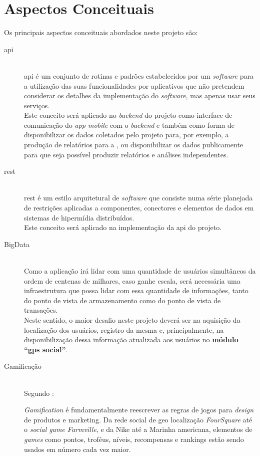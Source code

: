 \chapter{Aspectos Conceituais}\label{chp:aspectosConceituais}
Os principais aspectos conceituais abordados neste projeto são:
\begin{description}
    \item[\gls{api}] \cite{apifoldoc} \hfill \\
        \gls{api} é um conjunto de rotinas e padrões estabelecidos por um \textit{software} para a utilização das suas funcionalidades por aplicativos que não pretendem considerar os detalhes da implementação do \textit{software}, mas apenas usar seus serviços.\\
        Este conceito será aplicado no \textit{backend} do projeto como interface de comunicação do \textit{app mobile} com o \textit{backend} e também como forma de disponibilizar os dados coletados pelo projeto para, por exemplo, a produção de relatórios para a \sptrans, ou disponibilizar os dados publicamente para que seja possível produzir relatórios e análises independentes.%
%
	\item[\gls{rest}] \cite{Fielding2000} \hfill \\
	    \gls{rest} é um estilo arquitetural de \textit{software} que consiste numa série planejada de restrições aplicadas a componentes, conectores e elementos de dados em sistemas de hipermídia distribuídos. \\
	    Este conceito será aplicado na implementação da \gls{api} do projeto.%
%
	\item[BigData] \hfill \\
	    Como a aplicação irá lidar com uma quantidade de usuários simultâneos da ordem de centenas de milhares, caso ganhe escala, será necessária uma infraestrutura que possa lidar com essa quantidade de informações, tanto do ponto de vista de armazenamento como do ponto de vista de transações.\\
	    Neste sentido, o maior desafio neste projeto deverá ser na aquisição da localização dos usuários, registro da mesma e, principalmente, na disponibilização dessa informação atualizada aos usuários no \textbf{módulo ``gps social''}.%
%
	\item[Gamificação] \hfill \\
	    Segundo :
	    \begin{citacao}
	    \textit{Gamification} é fundamentalmente reescrever as regras de jogos para \textit{design} de produtos e marketing. Da rede social de geo localização \textit{FourSquare} até o \textit{social game Farmville}, e da Nike até a Marinha americana, elementos de \textit{games} como pontos, troféus, níveis, recompensas e rankings estão sendo usados em número cada vez maior.

\end{citacao}
\end{description}
